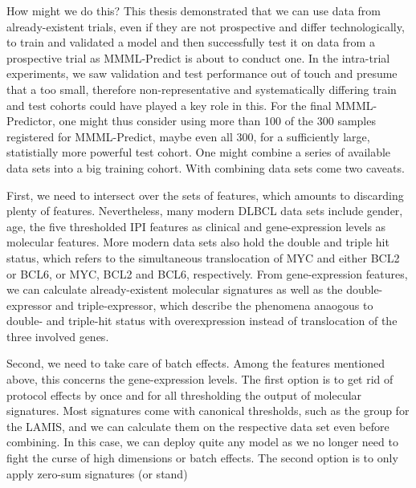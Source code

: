 How might we do this? This thesis demonstrated that we can use data from already-existent trials, 
even if they are not prospective and differ technologically, to train and validated a model and 
then successfully test it on data from a prospective trial as MMML-Predict is about to conduct one.
In the intra-trial experiments, we saw validation and test performance out of touch and presume 
that a too small, therefore non-representative and systematically differing train and test cohorts 
could have played a key role in this. For the final MMML-Predictor, one might thus consider 
using more than \num{100} of the \num{300} samples registered for MMML-Predict, maybe even all 
\num{300}, for a sufficiently large, statistially more powerful test cohort. One might combine 
a series of available data sets into a big training cohort. With combining data sets come two 
caveats. 

First, we need to intersect over the sets of features, which amounts to discarding plenty 
of features. Nevertheless, many modern DLBCL data sets include gender, age, the five thresholded 
IPI features as clinical and gene-expression levels as molecular features. More modern data sets 
also hold the double and triple hit status, which refers to the simultaneous translocation of MYC
and either BCL2 or BCL6, or MYC, BCL2 and BCL6, respectively. From gene-expression 
features, we can calculate already-existent molecular signatures as well as the double-expressor and 
triple-expressor, which describe the phenomena anaogous to double- and triple-hit status with 
overexpression instead of translocation of the three involved genes.

Second, we need to take care of batch effects. Among the features mentioned above, this concerns 
the gene-expression levels. The first option is to get rid of protocol effects by once and for all
thresholding the output of molecular signatures. Most signatures come with canonical thresholds, 
such as the group for the LAMIS, and we can calculate them on the respective data set even before 
combining. In this case, we can deploy quite any model as we no longer need to fight the curse 
of high dimensions or batch effects. The second option is to only apply zero-sum signatures (or 
stand)